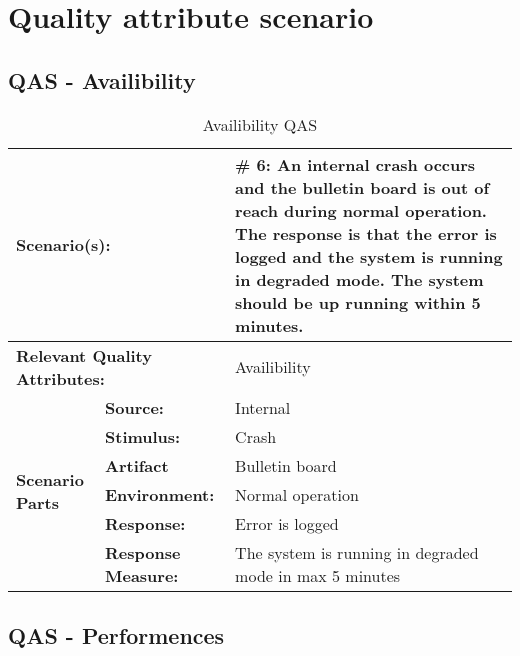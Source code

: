 \chapter{Quality attribute scenario}
\section{QAS - Availibility}
\label{sec:the_remaining_qas:Availibility}

\begin{table}[H]
\begin{center}
\begin{tabular}{|p{0.3cm}|p{2.5cm}|p{8cm}|}
  \hline
  \multicolumn{2}{|p{3cm}|}{\bfseries Scenario(s):} & \#  6: An internal crash occurs and the bulletin board is out of reach during normal operation. The response is that the error is logged and the system is running in degraded mode. The system should be up running within 5 minutes.\\
  \hline
  \multicolumn{2}{|p{3cm}|}{\bfseries Relevant Quality Attributes:} & Availibility\\
  \hline
  \multirow{6}{*}{\begin{sideways}{\bfseries Scenario Parts}\end{sideways}}
  & {\bfseries Source:} & Internal  \\
  \cline{2-3}
  & {\bfseries Stimulus:} & Crash \\
  \cline{2-3}
  & {\bfseries Artifact} &  Bulletin board \\
  \cline{2-3}
  & {\bfseries Environment:} &  Normal operation \\
  \cline{2-3}
  & {\bfseries Response:} &  Error is logged\\
  \cline{2-3}
  & {\bfseries Response Measure:} &  The system is running in degraded mode in max 5 minutes\\
  \hline
\end{tabular}
\caption{Availibility QAS}
\end{center}
\end{table}





\section{QAS - Performences}
\label{sec:the_remaining_qas:Performence}

